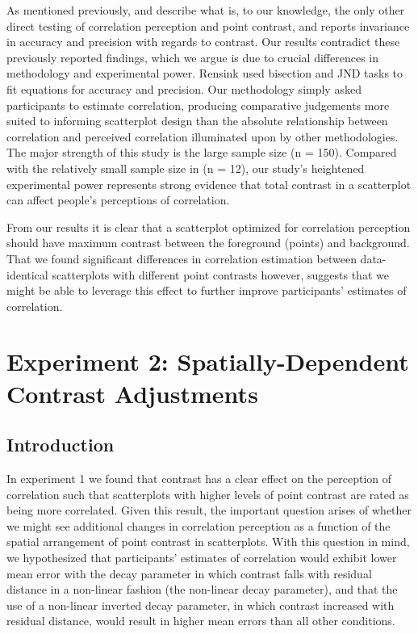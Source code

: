 \documentclass[preprint, 3p,
authoryear]{elsarticle} %
\begin{document}
As mentioned previously, \citet{rensink_2012} and \citet{rensink_2014}
describe what is, to our knowledge, the only other direct testing of
correlation perception and point contrast, and reports invariance in
accuracy and precision with regards to contrast. Our results contradict
these previously reported findings, which we argue is due to crucial
differences in methodology and experimental power. Rensink used
bisection and JND tasks to fit equations for accuracy and precision. Our
methodology simply asked participants to estimate correlation, producing
comparative judgements more suited to informing scatterplot design than
the absolute relationship between correlation and perceived correlation
illuminated upon by other methodologies. The major strength of this
study is the large sample size (n = 150). Compared with the relatively
small sample size in \citet{rensink_2014} (n = 12), our study's
heightened experimental power represents strong evidence that total
contrast in a scatterplot can affect people's perceptions of
correlation.

From our results it is clear that a scatterplot optimized for
correlation perception should have maximum contrast between the
foreground (points) and background. That we found significant
differences in correlation estimation between data-identical
scatterplots with different point contrasts however, suggests that we
might be able to leverage this effect to further improve participants'
estimates of correlation.

\hypertarget{experiment-2-spatially-dependent-contrast-adjustments}{%
\section{Experiment 2: Spatially-Dependent Contrast
Adjustments}\label{experiment-2-spatially-dependent-contrast-adjustments}}

\hypertarget{introduction-2}{%
\subsection{Introduction}\label{introduction-2}}

In experiment 1 we found that contrast has a clear effect on the
perception of correlation such that scatterplots with higher levels of
point contrast are rated as being more correlated. Given this result,
the important question arises of whether we might see additional changes
in correlation perception as a function of the spatial arrangement of
point contrast in scatterplots. With this question in mind, we
hypothesized that participants' estimates of correlation would exhibit
lower mean error with the decay parameter in which contrast falls with
residual distance in a non-linear fashion (the non-linear decay
parameter), and that the use of a non-linear inverted decay parameter,
in which contrast increased with residual distance, would result in
higher mean errors than all other conditions.
\end{document}
